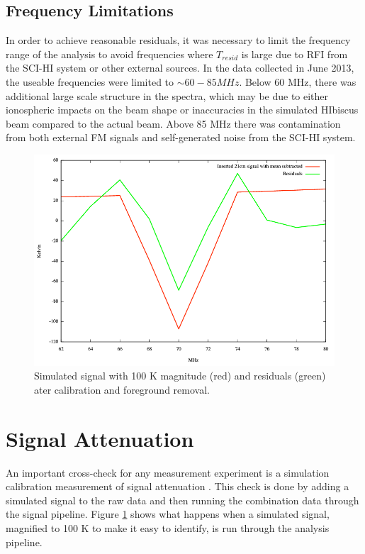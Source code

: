 \subsection{Frequency Limitations}

In order to achieve reasonable residuals, it was necessary to limit the frequency range of the analysis to avoid frequencies where $T_{resid}$ is large due to RFI from the SCI-HI system or other external sources. In the data collected in June 2013, the useable frequencies were limited to $\sim 60-85 MHz$. Below 60 MHz, there was additional large scale structure in the spectra, which may be due to either ionospheric impacts on the beam shape or inaccuracies in the simulated HIbiscus beam compared to the actual beam. Above 85 MHz there was contamination from both external FM signals and self-generated noise from the SCI-HI system. 

\begin{figure}[htb]
\begin{center}
\includegraphics[width=0.9\linewidth]{Data_analysis/figures/100_K_21cm_signal.png}
\caption{Simulated \cm signal with 100 K magnitude (red) and residuals (green) ater calibration and foreground removal. }
\label{Fig:100K_sim}
\end{center}
\end{figure}



\section{\cm Signal Attenuation}

An important cross-check for any \cm measurement experiment is a simulation calibration measurement of signal attenuation \cite{paciga_2013}. This check is done by adding a simulated \cm signal to the raw data and then running the combination data through the signal pipeline. Figure \ref{Fig:100K_sim} shows what happens when a simulated \cm signal, magnified to 100 K to make it easy to identify, is run through the analysis pipeline. 

